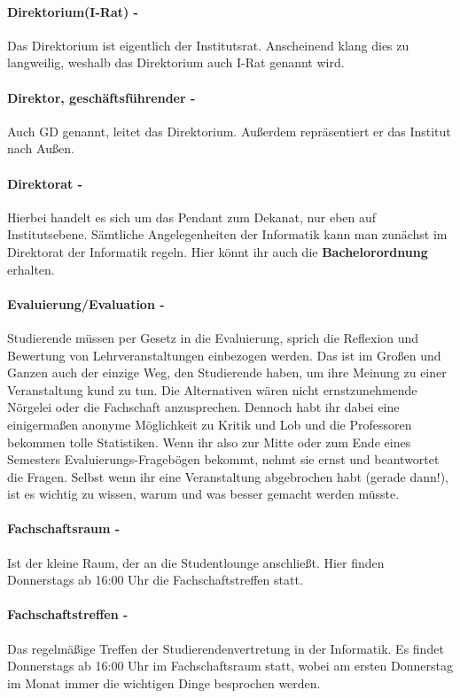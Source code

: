 \paragraph{Direktorium(I-Rat) -} Das Direktorium ist eigentlich der Institutsrat. Anscheinend klang dies zu langweilig, weshalb das Direktorium auch I-Rat genannt wird.
\paragraph{Direktor, geschäftsführender -} Auch GD genannt, leitet das Direktorium. Außerdem repräsentiert er das Institut nach Außen.
\paragraph{Direktorat -}  Hierbei handelt es sich um das Pendant zum Dekanat, nur eben auf Institutsebene. Sämtliche Angelegenheiten der Informatik kann man zunächst im Direktorat der Informatik regeln. Hier könnt ihr auch die \textbf{Bachelorordnung} erhalten.
\paragraph{Evaluierung/Evaluation -} Studierende müssen per Gesetz in die Evaluierung, sprich die Reflexion und Bewertung von Lehrveranstaltungen einbezogen werden. Das ist im Großen und Ganzen auch der einzige Weg, den Studierende haben, um ihre Meinung zu einer Veranstaltung kund zu tun. Die Alternativen wären nicht ernstzunehmende Nörgelei oder die Fachschaft anzusprechen. Dennoch habt ihr dabei eine einigermaßen anonyme Möglichkeit zu Kritik und Lob und die Professoren bekommen tolle Statistiken. Wenn ihr also zur Mitte  oder zum Ende eines Semesters Evaluierungs-Fragebögen bekommt, nehmt sie ernst und beantwortet die Fragen. Selbst wenn ihr eine Veranstaltung abgebrochen habt (gerade dann!), ist es wichtig zu wissen, warum und was besser gemacht werden müsste.
\paragraph{Fachschaftsraum -} Ist der kleine Raum, der an die Studentlounge anschließt. Hier finden Donnerstags ab 16:00 Uhr die Fachschaftstreffen statt.
\paragraph{Fachschaftstreffen -} Das regelmäßige Treffen der Studierendenvertretung in der Informatik. Es findet Donnerstags ab 16:00 Uhr im Fachschaftsraum statt, wobei am ersten Donnerstag im Monat immer die wichtigen Dinge besprochen werden.
